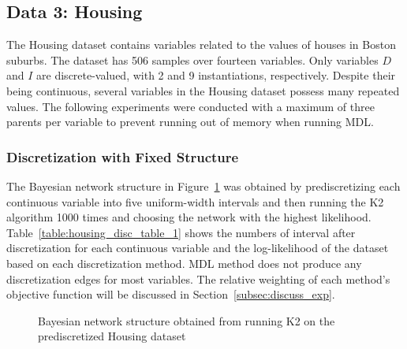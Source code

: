 \subsection{Data 3: Housing}
\label{subsec:housing}

The Housing dataset contains variables related to the values of houses in Boston suburbs.
The dataset has \num{506} samples over fourteen variables.
Only variables $D$ and $I$ are discrete-valued, with \num{2} and \num{9} instantiations, respectively.
Despite their being continuous, several variables in the Housing dataset possess many repeated values.
The following experiments were conducted with a maximum of three parents per variable to prevent running out of memory when running MDL.

\subsubsection{Discretization with Fixed Structure}
\label{subsubsec:housing_exp1}

The Bayesian network structure in Figure~\ref{fig:housing_graph_1} was obtained by prediscretizing each continuous variable into five uniform-width intervals and then running the K2 algorithm \num{1000} times and choosing the network with the highest likelihood.
Table~\ref{table:housing_disc_table_1} shows the numbers of interval after discretization for each continuous variable and the log-likelihood of the dataset based on each discretization method.
MDL method does not produce any discretization edges for most variables.
The relative weighting of each method's objective function will be discussed in Section~\ref{subsec:discuss_exp}.


\begin{figure}[ht]
  \centering
  \scalebox{0.8}{}
  \caption{Bayesian network structure obtained from running K2 on the prediscretized Housing dataset}
  \label{fig:housing_graph_1}
\end{figure}

